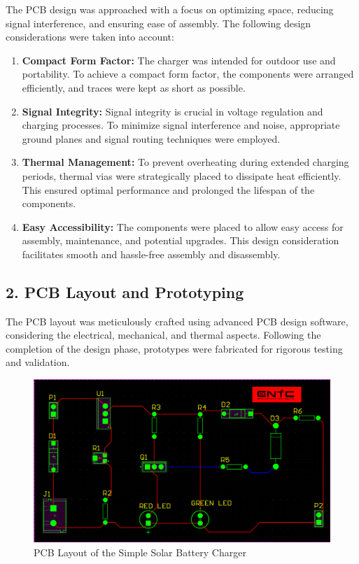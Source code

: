 \documentclass[twocolumn]{article}
\begin{document}
\noindent The PCB design was approached with a focus on optimizing space, reducing signal interference, and ensuring ease of assembly. The following design considerations were taken into account:

\begin{enumerate}
  \item \textbf{Compact Form Factor:} The charger was intended for outdoor use and portability. To achieve a compact form factor, the components were arranged efficiently, and traces were kept as short as possible.

  \item \textbf{Signal Integrity:} Signal integrity is crucial in voltage regulation and charging processes. To minimize signal interference and noise, appropriate ground planes and signal routing techniques were employed.

  \item \textbf{Thermal Management:} To prevent overheating during extended charging periods, thermal vias were strategically placed to dissipate heat efficiently. This ensured optimal performance and prolonged the lifespan of the components.

  \item \textbf{Easy Accessibility:} The components were placed to allow easy access for assembly, maintenance, and potential upgrades. This design consideration facilitates smooth and hassle-free assembly and disassembly.

\end{enumerate}

\subsection*{2. PCB Layout and Prototyping}

The PCB layout was meticulously crafted using advanced PCB design software, considering the electrical, mechanical, and thermal aspects. Following the completion of the design phase, prototypes were fabricated for rigorous testing and validation.

\begin{figure}[htbp]
  \centering
  \includegraphics[width=1.0\linewidth]{14.png}
  \caption{PCB Layout of the Simple Solar Battery Charger}
  \label{fig:pcb_layout}
\end{figure}
\end{document}
